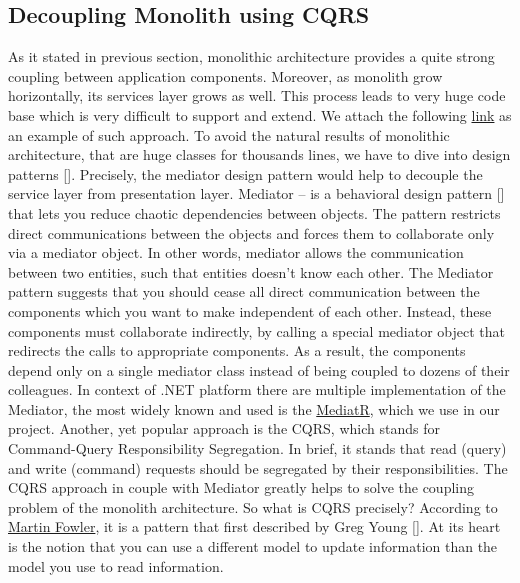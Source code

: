 \subsection{Decoupling Monolith using CQRS}\label{subsec:decoupling-monolith-using-cqrs}
As it stated in previous section, monolithic architecture provides a quite strong coupling between application
components.
Moreover, as monolith grow horizontally, its services layer grows as well.
This process leads to very huge code base which is very difficult to support and extend.
We attach the following
\href{https://github.com/smartstore/SmartStoreNET/blob/4.x/src/Presentation/SmartStore.Web/Controllers/CatalogHelper.cs}
{link}
as an example of such approach.
To avoid the natural results of monolithic architecture, that are huge classes for thousands lines, we have to dive into
design patterns [\cite{rising1998design}].
Precisely, the mediator design pattern would help to decouple the service layer from presentation layer.
Mediator -- is a behavioral design pattern [\cite{rasche2016building}] that lets you reduce chaotic dependencies between objects.
The pattern restricts direct communications between the objects and forces them to collaborate only via a mediator object.
In other words, mediator allows the communication between two entities, such that entities doesn't know each other.
The Mediator pattern suggests that you should cease all direct communication between the components which you want to make
independent of each other.
Instead, these components must collaborate indirectly, by calling a special mediator object that redirects the calls to
appropriate components.
As a result, the components depend only on a single mediator class instead of being coupled to dozens of their colleagues.
In context of .NET platform there are multiple implementation of the Mediator, the most widely known and used is the
\href{https://github.com/jbogard/MediatR}{MediatR}, which we use in our project.
Another, yet popular approach is the CQRS, which stands for Command-Query Responsibility Segregation.
In brief, it stands that read (query) and write (command) requests should be segregated by their responsibilities.
The CQRS approach in couple with Mediator greatly helps to solve the coupling problem of the monolith architecture.
So what is CQRS precisely?
According to \href{https://martinfowler.com/bliki/CQRS.html}{Martin Fowler},
it is a pattern that first described by Greg Young [\cite{young2010cqrs}].
At its heart is the notion that you can use a different model to update information than the model you use to read information.
